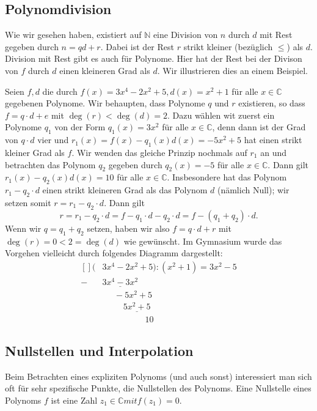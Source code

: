 \documentclass[../Analysis1_script.tex]{subfiles}
\begin{document}
\subsection{Polynomdivision}
	Wie wir gesehen haben, existiert auf $\mathbb {N}$ eine Division von $n$ durch $d$ mit Rest gegeben durch $n=qd+r$. Dabei ist der Rest $r$ strikt kleiner (bezüglich $\leq$) als $d$. Division mit Rest gibt es auch für Polynome. Hier hat der Rest bei der Divison von $f$ durch $d$ einen kleineren Grad als $d$. Wir illustrieren dies an einem Beispiel.
	
\begin{example}
	Seien $f, d$ die durch $f(x) = 3x^4 - 2x^2 + 5, d(x) = x^2 + 1$ für alle $x \in \mathbb{C}$ gegebenen Polynome. Wir behaupten, dass Polynome $q$ und $r$ existieren, so dass $f = q\cdot d + e$ mit $\deg(r) < \deg(d) = 2$. Dazu wählen wit zuerst ein Polynome $q_1$ von der Form $q_1(x) = 3x^2$ für alle $x \in \mathbb{C}$, denn dann ist der Grad von $q \cdot d$ vier und $r_1(x) = f(x) -q_1(x)d(x) = -5x^2+5$ hat einen strikt kleiner Grad als $f$. Wir wenden das gleiche Prinzip nochmals auf $r_1$ an und betrachten das Polynom $q_2$ gegeben durch $q_2(x) = -5$ für alle $x\in \mathbb {C}$. Dann gilt $r_1(x)-q_2(x)d(x) = 10$ für alle $x\in \mathbb {C}$. Insbesondere hat das Polynom $r_1-q_2\cdot d$ einen strikt kleineren Grad als das Polynom $d$ (nämlich Null); wir setzen somit $r = r_1-q_2\cdot d$. Dann gilt 
	\[r = r_1-q_2\cdot d = f- q_1 \cdot d - q_2 \cdot d = f- (q_1+q_2) \cdot d.\]
	Wenn wir $q = q_1 + q_2$ setzen, haben wir also $f= q\cdot d + r$ mit $\deg (r) = 0 < 2 = \deg (d)$ wie gewünscht. Im Gymnasium wurde das Vorgehen vielleicht durch folgendes Diagramm dargestellt: 
	\[\begin{aligned}[]
		(&3x^4 -2x^2+5):(x^2+1) = 3x^2-5\\ 
		-&\underline{3x^4 -3x^2}\\ & \quad \ \, -5x^2 + 5\\ 
		& \quad \ \ \quad \underline{5x^2 + 5}\\ & \qquad \qquad \quad 10
	\end{aligned}\] 
\end{example}


\subsection{Nullstellen und Interpolation}
	Beim Betrachten eines expliziten Polynoms (und auch sonst) interessiert man sich oft für sehr spezifische Punkte, die Nullstellen des Polynoms. Eine Nullstelle eines Polynoms $f$ ist eine Zahl $z_1 \in \mathbb {C} mit f(z_1) = 0$.
\end{document}
